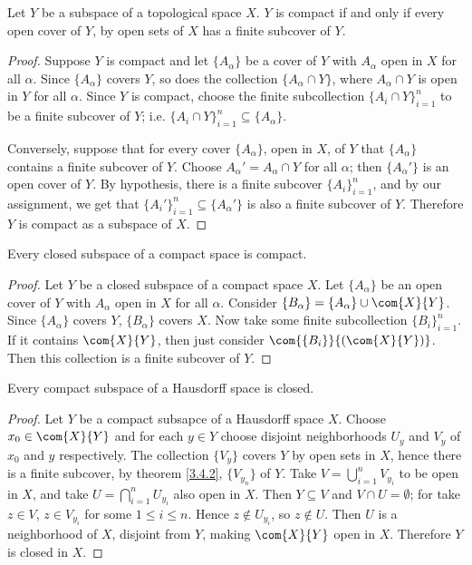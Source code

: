 \begin{lemma}\label{3.4.1}
    Let $Y$ be a subspace of a topological space  $X$.  $Y$ is compact if and only if every open
    cover of  $Y$, by open sets of  $X$ has a finite subcover of $Y$.
\end{lemma}
\begin{proof}
    Suppose $Y$ is compact and let  $\{A_\alpha\}$ be a cover of $Y$ with  $A_\alpha$ open in  $X$
    for all  $\alpha$. Since  $\{A_\alpha\}$ covers $Y$, so does the collection  $\{A_\alpha \cap
    Y\}$, where $A_\alpha \cap Y$ is open in  $Y$ for all  $\alpha$. Since  $Y$ is compact, choose
    the finite subcollection  $\{A_i \cap Y\}_{i=1}^{n}$ to be a finite subcover of $Y$; i.e.
    $\{A_i \cap Y\}_{i=1}^{n} \subseteq \{A_\alpha\}$.

    Conversely, suppose that for every cover $\{A_\alpha\}$, open in  $X$, of  $Y$ that
    $\{A_\alpha\}$ contains a finite subcover of $Y$. Choose  $A_\alpha'=A_\alpha \cap Y$ for all
    $\alpha$; then $\{A_\alpha'\}$ is an open cover of $Y$.
    By hypothesis, there is a finite subcover $\{A_i\}_{i=1}^n$, and by our assignment, we
    get that $\{A_i'\}_{i=1}^n \subseteq \{A_\alpha'\}$ is also a finite subcover of $Y$. Therefore
     $Y$ is compact as a subspace of  $X$.
\end{proof}

\begin{theorem}\label{3.4.2}
    Every closed subspace of a compact space is compact.
\end{theorem}
\begin{proof}
    Let $Y$ be a closed subspace of a compact space $X$. Let $\{A_\alpha\}$ be an open cover of $Y$
    with  $A_\alpha$ open in  $X$ for all  $\alpha$. Consider  $\{B_\alpha\}=\{A_\alpha\} \cup
    \com{X}{Y}$. Since $\{A_\alpha\}$ covers $Y$,  $\{B_\alpha\}$ covers $X$. Now take some finite
    subcollection  $\{B_i\}_{i=1}^n$. If it contains $\com{X}{Y}$, then just consider
    $\com{\{B_i\}}{(\com{X}{Y})}$. Then this collection is a finite subcover of $Y$.
\end{proof}

\begin{theorem}\label{3.4.3}
    Every compact subspace of a Hausdorff space is closed.
\end{theorem}
\begin{proof}
    Let $Y$ be a compact subsapce of a Hausdorff space  $X$. Choose  $x_0 \in \com{X}{Y}$ and for
    each $y \in Y$ choose disjoint neighborhoods  $U_y$ and  $V_y$ of  $ x_0$ and $y$ respectively.
    The collection  $\{V_y\}$ covers $Y$ by open sets in  $X$, hence there is a finite subcover, by
    theorem \ref {3.4.2}, $\{V_{y_n}\}$ of $Y$. Take  $V=\bigcup_{i=1}^n{V_{y_i}}$ to be open in
$X$, and take  $U=\bigcap_{i=1}^n{U_{y_i}}$ also open in $X$. Then  $Y \subseteq V$ and  $V \cap
U=\emptyset$; for take $z \in V$,  $z \in V_{y_i}$ for some $1 \leq i \leq n$. Hence  $z \notin
U_{y_i}$, so $z \notin U$. Then  $U$ is a neighborhood of  $X$, disjoint from  $Y$, making
$\com{X}{Y}$ open in $X$. Therefore  $Y$ is closed in  $X$.
\end{proof}

